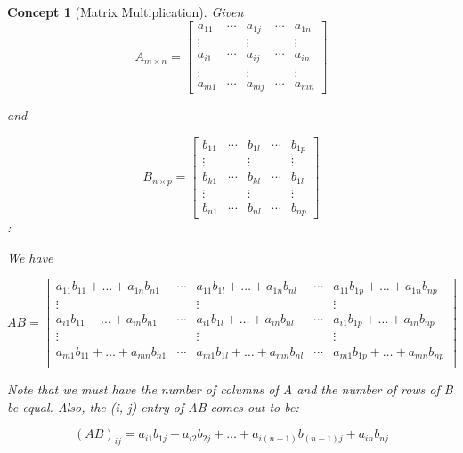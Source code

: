 \documentclass[12pt]{report}
\newtheorem{cpt}{Concept}
\begin{document}
\begin{cpt}[Matrix Multiplication]

Given
\begin{equation*}
A_{m\times n}=
\begin{bmatrix}
a_{11} & \cdots & a_{1j} & \cdots  & a_{1n} \\
\vdots & & \vdots & & \vdots \\
a_{i1} & \cdots & a_{ij} & \cdots & a_{in} \\
\vdots & & \vdots & & \vdots \\
a_{m1} & \cdots & a_{mj} & \cdots & a_{mn}
\end{bmatrix}
\end{equation*}

and

\begin{equation*}
B_{n\times p}=
\begin{bmatrix}
b_{11} & \cdots & b_{1l} & \cdots  & b_{1p} \\
\vdots & & \vdots & & \vdots \\
b_{k1} & \cdots & b_{kl} & \cdots & b_{1l} \\
\vdots & & \vdots & & \vdots \\
b_{n1} & \cdots & b_{nl} & \cdots & b_{np}
\end{bmatrix}
\end{equation*}:

We have

\begin{equation}
AB=
\begin{bmatrix}
a_{11}b_{11}+\ldots+a_{1n}b_{n1} & \cdots & a_{11}b_{1l}+\ldots+a_{1n}b_{nl} & \cdots & a_{11}b_{1p}+\ldots+a_{1n}b_{np} \\
\vdots & & \vdots & & \vdots \\
a_{i1}b_{11}+\ldots+a_{in}b_{n1} & \cdots & a_{i1}b_{1l}+\ldots+a_{in}b_{nl} & \cdots & a_{i1}b_{1p}+\ldots+a_{in}b_{np} \\
\vdots & & \vdots & & \vdots \\
a_{m1}b_{11}+\ldots+a_{mn}b_{n1} & \cdots & a_{m1}b_{1l}+\ldots+a_{mn}b_{nl} & \cdots & a_{m1}b_{1p}+\ldots+a_{mn}b_{np} \\
\end{bmatrix}
\end{equation}

Note that we must have the number of columns of A and the number of rows of B be equal. Also, the (i, j) entry of AB comes out to be:

\begin{equation}
(AB)_{ij}=a_{i1}b_{1j}+a_{i2}b_{2j}+\ldots+a_{i(n-1)}b_{(n-1)j}+a_{in}b_{nj}
\end{equation}
\end{cpt}
\end{document}
